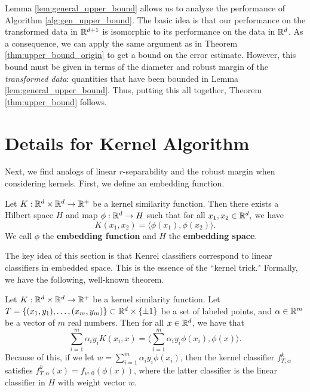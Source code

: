 Lemma \ref{lem:general_upper_bound} allows us to analyze the performance of Algorithm \ref{alg:gen_upper_bound}. The basic idea is that our performance on the transformed data in $\mathbb R^{d+1}$ is isomorphic to its performance on the data in $\mathbb R^d$. As a consequence, we can apply the same argument as in Theorem \ref{thm:upper_bound_origin} to get a bound on the error estimate. However, this bound must be given in terms of the diameter and robust margin of the \textit{transformed data}: quantities that have been bounded in Lemma \ref{lem:general_upper_bound}. Thus, putting this all together, Theorem \ref{thm:upper_bound} follows.


\section{Details for Kernel Algorithm}\label{sec:kernel_appendix}

Next, we find analogs of linear $r$-separability and the robust margin when considering kernels. First, we define an embedding function.

\begin{defn}\label{defn:embedding_function}
Let $K: \mathbb R^d \times \mathbb R^d \to \mathbb R^+$ be a kernel similarity function. Then there exists a Hilbert space $H$ and map $\phi: \mathbb R^d \to H$ such that for all $x_1, x_2 \in \mathbb R^d,$ we have $$K(x_1, x_2) = \langle \phi(x_1), \phi(x_2) \rangle.$$ We call $\phi$ the \textbf{embedding function} and $H$ the \textbf{embedding space}.
\end{defn}

The key idea of this section is that Kenrel classifiers correspond to linear classifiers in embedded space. This is the essence of the ``kernel trick." Formally, we have the following, well-known theorem. 

\begin{thm}\label{thm:kernel_trick}
Let $K:\mathbb R^d \times \mathbb R^d \to \mathbb R^+$ be a kernel similarity function. Let $T = \{(x_1, y_1), \dots, (x_m, y_m)\} \subset \mathbb R^d \times \{\pm 1\}$ be a set of labeled points, and $\alpha \in \mathbb R^m$ be a vector of $m$ real numbers. Then for all $x \in \mathbb R^d$, we have that $$\sum_{i = 1}^m \alpha_iy_iK(x_i, x) = \big \langle \sum_{i= 1}^m \alpha_iy_i\phi(x_i), \phi(x) \big \rangle.$$ Because of this, if we let $w = \sum_{i=1}^m \alpha_iy_i\phi(x_i)$, then the kernel classifier $f_{T, \alpha}^k$ satisfies $f_{T, \alpha}^k(x) = f_{w, 0}(\phi(x))$, where the latter classifier is the linear classifier in $H$ with weight vector $w$. 
\end{thm}

